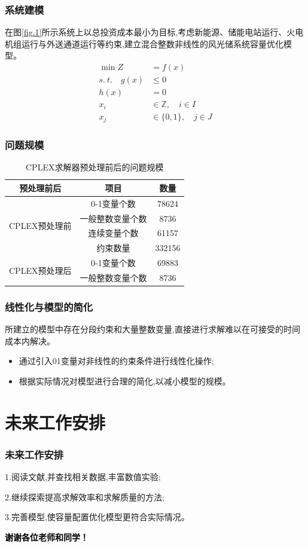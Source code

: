 \documentclass{beamer}
\begin{document}
\begin{frame}
	\frametitle{系统建模} 
	\qquad 在图\ref*{fig.1}所示系统上以总投资成本最小为目标,考虑新能源、储能电站运行、火电机组运行与外送通道运行等约束,建立混合整数非线性的风光储系统容量优化模型。
	\begin{align}
		\min Z&=f(x)\label{eq.1}\\
		s.\ t. \quad g(x) &\leq 0 \label{eq.2}\\
		h(x)&=0 \label{eq.3}\\
		x_i &\in \mathbb{Z},\quad  i \in I \label{eq.4}\\
		x_j &\in \{0,1\}, \quad j \in J \label{eq.5}
	\end{align}
\end{frame}

\begin{frame}
	\frametitle{问题规模}
	\begin{table}[htbp]
		\centering
		\caption{CPLEX求解器预处理前后的问题规模}
		\label{tab.1}
		\begin{tabular}{|c|c|c|}
		\hline
		预处理前后 & 项目 & 数量  \\ \hline
		\multirow{4}{*}{CPLEX预处理前}	& 0-1变量个数  		& 78624  \\ \cline{2-3} 
										& 一般整数变量个数 	& 8736   \\ \cline{2-3} 
								   		& 连续变量个数   	& 61157  \\ \cline{2-3} 
								   		& 约束数量			& 332156 \\ \hline
		\multirow{2}{*}{CPLEX预处理后} 	& 0-1变量个数		& 69883  \\ \cline{2-3} 
								   		& 一般整数变量个数 	& 8736   \\ \hline
		\end{tabular}
	\end{table}
\end{frame}

\begin{frame}
	\frametitle{线性化与模型的简化}
	\qquad 所建立的模型中存在分段约束和大量整数变量,直接进行求解难以在可接受的时间成本内解决。
	\begin{itemize}
		\item 通过引入01变量对非线性的约束条件进行线性化操作;
		\item 根据实际情况对模型进行合理的简化,以减小模型的规模。
	\end{itemize}
\end{frame}

\section{未来工作安排}
\begin{frame}
	\frametitle{未来工作安排} 
	1.阅读文献,并查找相关数据,丰富数值实验;

	2.继续探索提高求解效率和求解质量的方法;

	3.完善模型,使容量配置优化模型更符合实际情况。
\end{frame}

\begin{frame}
\vspace{1em}
\centering
\textcolor{black}{\LARGE\bf 谢谢各位老师和同学！}

\end{frame}
\end{document}

